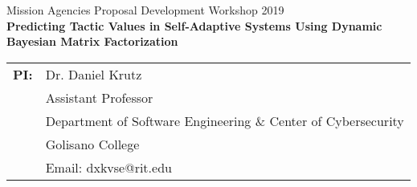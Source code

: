 \documentclass[12pt]{article}
\newcommand{\Title}{Predicting Tactic Values in Self-Adaptive Systems Using Dynamic Bayesian Matrix Factorization}
\newcommand{\CallNumber}{Mission Agencies Proposal Development Workshop 2019}
\newcommand{\CallName}{BBBB}
\begin{document}
\begin{titlepage}
\newcommand{\HRule}{\rule{\linewidth}{0.3mm}} %




\noindent\large \CallNumber\\[.20cm] %

\noindent \LARGE \textbf{\Title}\\[.10cm] %





\begin{tabular}{ L{15mm} L{120mm} }






\normalsize \textbf{PI:} & \normalsize  Dr. Daniel Krutz \\
    & \vspace{-6mm} \normalsize Assistant Professor \\
    & \vspace{-12mm} \normalsize Department of Software Engineering \& Center of Cybersecurity
 \\
   & \vspace{-18mm} \normalsize Golisano College \\
   & \vspace{-24mm} \normalsize Email: dxkvse@rit.edu \\



\end{tabular}
\end{titlepage}
\end{document}
